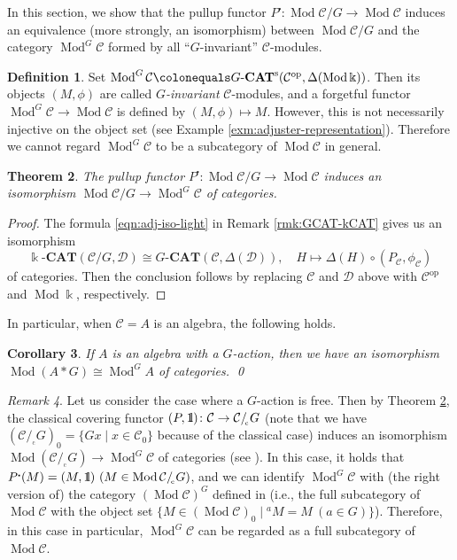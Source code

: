 \documentclass{surv-l}
\numberwithin{equation}{chapter}
\numberwithin{figure}{chapter}
\theoremstyle{plain}
\newtheorem{thm}{Theorem}[section]
\newtheorem{cor}[thm]{Corollary}
\theoremstyle{definition}
\newtheorem{dfn}[thm]{Definition}
\theoremstyle{remark}
\newtheorem{rmk}[thm]{Remark}
\newcommand{\id}{1\kern-.25em{\text{{\rm l}}}}
\newcommand{\corbit}{/\!_{_{\mathrm{c}}}}
\newcommand{\kCAT}{\Bbbk\text{-}\mathbf{CAT}}
\newcommand{\GCATs}{G\text{-}\mathbf{CAT}^{\mathrm{s}}}
\newcommand{\GCAT}{G\text{-}\mathbf{CAT}}
\DeclareMathOperator{\Mod}{Mod}
\begin{document}
In this section, we show that the pullup functor $P^{\centerdot}\colon \Mod{\mathcal{C}}/G \to \Mod{\mathcal{C}}$
induces an equivalence (more strongly, an isomorphism) between $\Mod {\mathcal{C}}/G$ and
the category $\Mod^{G} {\mathcal{C}}$ formed by all ``$G$-invariant'' ${\mathcal{C}}$-modules.%

\begin{dfn}
\label{G-inv}
Set $\Mod^{G}{\mathcal{C}}\colonequals  \GCATs({\mathcal{C}}^{\mathrm{op}}, \Delta(\Mod \Bbbk))$.
Then its objects $(M, \phi)$ are called \emph{$G$-invariant} ${\mathcal{C}}$-modules,
and a forgetful functor $\Mod^{G}{\mathcal{C}} \to \Mod{\mathcal{C}}$ is defined by
$(M, \phi) \mapsto M$.
However, this is not necessarily injective on the object set (see Example \ref{exm:adjuster-representation}).
Therefore we cannot regard $\Mod^{G}{\mathcal{C}}$ to be a subcategory of $\Mod{\mathcal{C}}$ in general.
\end{dfn}

\begin{thm}\label{thm:pullup-iso}
The pullup functor $P^{\centerdot}\colon \Mod {\mathcal{C}}/G \to \Mod {\mathcal{C}}$ induces
an {\em isomorphism} $\Mod {\mathcal{C}}/G \to \Mod^{G}{\mathcal{C}}$ of categories.
\end{thm}

\begin{proof}
The formula \eqref{eqn:adj-iso-light} in Remark \ref{rmk:GCAT-kCAT}
gives us an isomorphism
\[
\kCAT({\mathcal{C}}/G, {\mathcal{D}}) \cong \GCAT({\mathcal{C}}, \Delta({\mathcal{D}})), \quad
H \mapsto \Delta(H)\circ (P_{\mathcal{C}}, \phi_{\mathcal{C}})
\]
of categories.
Then the conclusion follows by replacing ${\mathcal{C}}$ and ${\mathcal{D}}$ above
with ${\mathcal{C}}^{\mathrm{op}}$ and $\Mod \Bbbk$, respectively.
\end{proof}

In particular, when ${\mathcal{C}} = A$ is an algebra, the following holds.

\begin{cor}
If $A$ is an algebra with a $G$-action, then
we have an isomorphism $\Mod (A*G) \cong \Mod^{G}A$ of categories.
\hfil \qed
\end{cor}

\begin{rmk}
Let us consider the case where a $G$-action is free.
Then by Theorem \ref{thm:pullup-iso}, the classical covering functor
$(P, \id)\colon {\mathcal{C}} \to {\mathcal{C}}\corbit G$
(note that we have $({\mathcal{C}}\corbit G)_0 = \{Gx \mid x \in {\mathcal{C}}_0\}$ because of the classical case)
induces an isomorphism $\Mod ({\mathcal{C}}\corbit G) \to \Mod^G{\mathcal{C}}$ of categories
(see \cite[Theorem 4.3]{C-M}).
In this case, it holds that $P^{\centerdot}(M) = (M, \id) \ (M \in \Mod{\mathcal{C}}\corbit G)$,
and we can identify $\Mod^G{\mathcal{C}}$ with (the right version of) the category $(\Mod{\mathcal{C}})^G$
defined in \cite{C-M}
(i.e., the full subcategory of $\Mod{\mathcal{C}}$ with the object set
$\{M \in (\Mod{\mathcal{C}})_0 \mid {}^a M = M\ (a \in G)\}$).
Therefore, in this case in particular,
$\Mod^G{\mathcal{C}}$ can be regarded as a full subcategory of $\Mod{\mathcal{C}}$.
\end{rmk}
\end{document}
